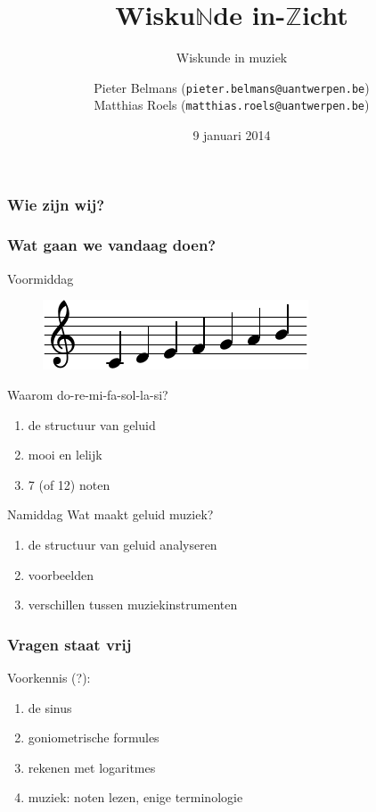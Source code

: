 \documentclass[compress, darktitle, framenumber, totalframenumber]{beamer}
\title{Wisku$\mathbb{N}$de in-$\mathbb{Z}$icht}
\subtitle{Wiskunde in muziek}
\author{Pieter Belmans (\texttt{pieter.belmans@uantwerpen.be}) \\ Matthias Roels (\texttt{matthias.roels@uantwerpen.be})}
\date{9 januari 2014}
\begin{document}
\begin{frame}
  \titlepage
\end{frame}

\begin{frame}
  \frametitle{Wie zijn wij?}
\end{frame}

\begin{frame}
  \frametitle{Wat gaan we vandaag doen?}

  \begin{block}{Voormiddag}
    \begin{figure}
      \centering
      \includegraphics{scores/scale-cropped}
    \end{figure}
    Waarom do-re-mi-fa-sol-la-si?
    \begin{enumerate}
      \item de structuur van geluid
      \item mooi en lelijk
      \item 7 (of 12) noten
    \end{enumerate}
  \end{block}

  \pause

  \begin{block}{Namiddag}
    Wat maakt geluid muziek?
    \begin{enumerate}
      \item de structuur van geluid analyseren
      \item voorbeelden
      \item verschillen tussen muziekinstrumenten
    \end{enumerate}
  \end{block}
\end{frame}

\begin{frame}
  \frametitle{Vragen staat vrij}

  Voorkennis (?):
  \begin{enumerate}
    \item de sinus
    \item goniometrische formules
    \item rekenen met logaritmes
    \item muziek: noten lezen, enige terminologie
  \end{enumerate}
\end{frame}
\end{document}
